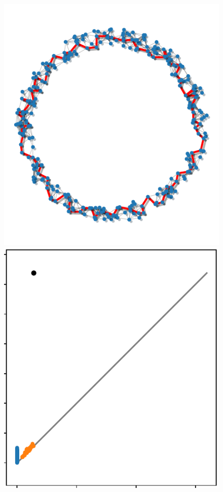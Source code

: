 \begin{figure}[htbp]
\centering
    \includegraphics[scale=0.9]{figures/homology_cycle.pdf}\hspace{10ex}
    \includegraphics[scale=0.8]{figures/homology_dgm.pdf}

\end{figure}
